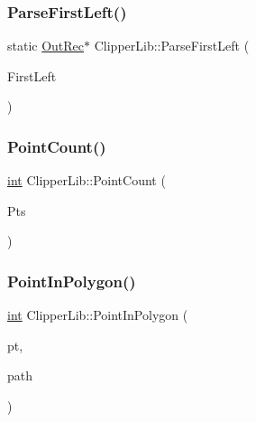\mbox{\label{namespace_clipper_lib_ab4671015e7694c784513f3d3ea4405ce}} 
\subsubsection{\texorpdfstring{ParseFirstLeft()}{ParseFirstLeft()}}
{\footnotesize\ttfamily static \mbox{\hyperlink{struct_clipper_lib_1_1_out_rec}{Out\+Rec}}$\ast$ Clipper\+Lib\+::\+Parse\+First\+Left (\begin{DoxyParamCaption}\item[{\mbox{\hyperlink{struct_clipper_lib_1_1_out_rec}{Out\+Rec}} $\ast$}]{First\+Left }\end{DoxyParamCaption})\hspace{0.3cm}{\ttfamily [static]}}

\mbox{\label{namespace_clipper_lib_a116d97a3199f4a29f2327b498af00469}} 
\subsubsection{\texorpdfstring{PointCount()}{PointCount()}}
{\footnotesize\ttfamily \mbox{\hyperlink{draw_8hh_aa620a13339ac3a1177c86edc549fda9b}{int}} Clipper\+Lib\+::\+Point\+Count (\begin{DoxyParamCaption}\item[{\mbox{\hyperlink{struct_clipper_lib_1_1_out_pt}{Out\+Pt}} $\ast$}]{Pts }\end{DoxyParamCaption})}

\mbox{\label{namespace_clipper_lib_ac7314f2a1f45c627bac20e9ba2a68212}} 
\subsubsection{\texorpdfstring{PointInPolygon()}{PointInPolygon()}\hspace{0.1cm}{\footnotesize\ttfamily [1/2]}}
{\footnotesize\ttfamily \mbox{\hyperlink{draw_8hh_aa620a13339ac3a1177c86edc549fda9b}{int}} Clipper\+Lib\+::\+Point\+In\+Polygon (\begin{DoxyParamCaption}\item[{const \mbox{\hyperlink{struct_clipper_lib_1_1_int_point}{Int\+Point}} \&}]{pt,  }\item[{const \mbox{\hyperlink{namespace_clipper_lib_af39c8fe00f278f18cc8142fef41242da}{Path}} \&}]{path }\end{DoxyParamCaption})}

